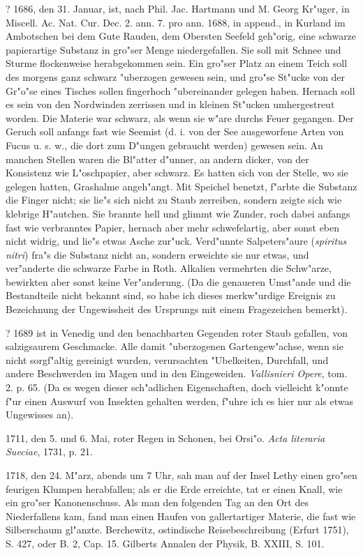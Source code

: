 \documentclass[a4paper, 11pt, oneside, polutonikogreek, german]{article}
\begin{document}
? 1686, den 31. Januar, ist, nach Phil. Jac. Hartmann und M. Georg Kr"uger, in Miscell. Ac. Nat. Cur. Dec. 2. ann. 7. pro ann. 1688, in append., in Kurland im Ambotschen bei dem Gute Rauden, dem Obersten Seefeld geh"orig, eine schwarze papierartige Substanz in gro"ser Menge niedergefallen. Sie soll mit Schnee und Sturme flockenweise herabgekommen sein. Ein gro"ser Platz an einem Teich soll des morgens ganz schwarz "uberzogen gewesen sein, und gro"se St"ucke von der Gr"o"se eines Tisches sollen fingerhoch "ubereinander gelegen haben. Hernach soll es sein von den Nordwinden zerrissen und in kleinen St"ucken umhergestreut worden. Die Materie war schwarz, als wenn sie w"are durchs Feuer gegangen. Der Geruch soll anfangs fast wie Seemist (d. i. von der See ausgeworfene Arten von Fucus u. s. w., die dort zum D"ungen gebraucht werden) gewesen sein. An manchen Stellen waren die Bl"atter d"unner, an andern dicker, von der Konsistenz wie L"oschpapier, aber schwarz. Es hatten sich von der Stelle, wo sie gelegen hatten, Grashalme angeh"angt. Mit Speichel benetzt, f"arbte die Substanz die Finger nicht; sie lie"s sich nicht zu Staub zerreiben, sondern zeigte sich wie klebrige H"autchen. Sie brannte hell und glimmt wie Zunder, roch dabei anfangs fast wie verbranntes Papier, hernach aber mehr schwefelartig, aber sonst eben nicht widrig, und lie"s etwas Asche zur"uck. Verd"unnte Salpeters"aure (\emph{spiritus nitri}) fra"s die Substanz nicht an, sondern erweichte sie nur etwas, und ver"anderte die schwarze Farbe in Roth. Alkalien vermehrten die Schw"arze, bewirkten aber sonst keine Ver"anderung. (Da die genaueren Umst"ande und die Bestandteile nicht bekannt sind, so habe ich dieses merkw"urdige Ereignis zu Bezeichnung der Ungewissheit des Ursprungs mit einem Fragezeichen bemerkt).

? 1689 ist in Venedig und den benachbarten Gegenden roter Staub gefallen, von salzigsaurem Geschmacke. Alle damit "uberzogenen Gartengew"achse, wenn sie nicht sorgf"altig gereinigt wurden, verursachten "Ubelkeiten, Durchfall, und andere Beschwerden im Magen und in den Eingeweiden. \emph{Vallisnieri Opere}, tom. 2. p. 65. (Da es wegen dieser sch"adlichen Eigenschaften, doch vielleicht k"onnte f"ur einen Auswurf von Insekten gehalten werden, f"uhre ich es hier nur als etwas Ungewisses an).

1711, den 5. und 6. Mai, roter Regen in Schonen, bei Orsi"o. \emph{Acta literaria Sueciae}, 1731, p. 21.

1718, den 24. M"arz, abends um 7 Uhr, sah man auf der Insel Lethy einen gro"sen feurigen Klumpen herabfallen; als er die Erde erreichte, tat er einen Knall, wie ein gro"ser Kanonenschuss. Als man den folgenden Tag an den Ort des Niederfallens kam, fand man einen Haufen von gallertartiger Materie, die fast wie Silberschaum gl"anzte. Berchewitz, ostindische Reisebeschreibung (Erfurt 1751), S. 427, oder B. 2, Cap. 15. Gilberts Annalen der Physik, B. XXIII, S. 101.
\end{document}
